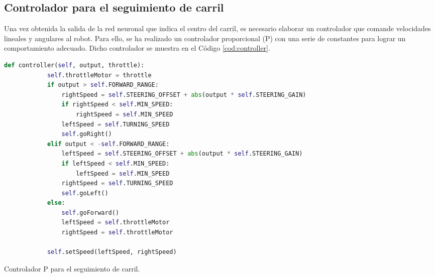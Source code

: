 \subsection{Controlador para el seguimiento de carril}
Una vez obtenida la salida de la red neuronal que indica el centro del carril, es necesario elaborar un controlador que comande velocidades lineales y angulares al robot. Para ello, se ha realizado un controlador proporcional (P) con una serie de constantes para lograr un comportamiento adecuado. Dicho controlador se muestra en el Código \ref{cod:controller}.\\ 
\begin{code}[h]
	\begin{lstlisting}[language=Python]
		def controller(self, output, throttle):
			self.throttleMotor = throttle
			if output > self.FORWARD_RANGE:
				rightSpeed = self.STEERING_OFFSET + abs(output * self.STEERING_GAIN)
				if rightSpeed < self.MIN_SPEED:
					rightSpeed = self.MIN_SPEED
				leftSpeed = self.TURNING_SPEED
				self.goRight()
			elif output < -self.FORWARD_RANGE:
				leftSpeed = self.STEERING_OFFSET + abs(output * self.STEERING_GAIN)
				if leftSpeed < self.MIN_SPEED:
					leftSpeed = self.MIN_SPEED
				rightSpeed = self.TURNING_SPEED
				self.goLeft()
			else:
				self.goForward()
				leftSpeed = self.throttleMotor
				rightSpeed = self.throttleMotor
			
			self.setSpeed(leftSpeed, rightSpeed)
	\end{lstlisting}
	\caption[Controlador P para el seguimiento de carril.]{Controlador P para el seguimiento de carril.}
	\label{cod:controller}
\end{code}
